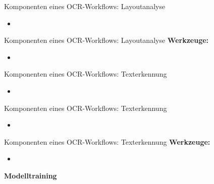 \documentclass{bbawslides}
\begin{document}
\begin{bbawslide}{Komponenten eines OCR-Workflows: Layoutanalyse}
  \vspace*{7mm}%
  \centerslidestrue%
  \begin{itemize}
    \item
  \end{itemize}
\end{bbawslide}

\begin{bbawslide}{Komponenten eines OCR-Workflows: Layoutanalyse}
  \vspace*{7mm}%
  \centerslidestrue%
  \textbf{Werkzeuge:}
  \begin{itemize}
    \item
  \end{itemize}
\end{bbawslide}

\begin{bbawslide}{Komponenten eines OCR-Workflows: Texterkennung}
  \vspace*{7mm}%
  \centerslidestrue%
  \begin{itemize}
    \item
  \end{itemize}
\end{bbawslide}

\begin{bbawslide}{Komponenten eines OCR-Workflows: Texterkennung}
  \vspace*{7mm}%
  \centerslidestrue%
  \begin{itemize}
    \item
  \end{itemize}
\end{bbawslide}

\begin{bbawslide}{Komponenten eines OCR-Workflows: Texterkennung}
  \vspace*{7mm}%
  \centerslidestrue%
  \textbf{Werkzeuge:}
  \begin{itemize}
    \item
  \end{itemize}
\end{bbawslide}

\begin{bbawpart}{\Large\bf Modelltraining}
\end{bbawpart}
\end{document}
